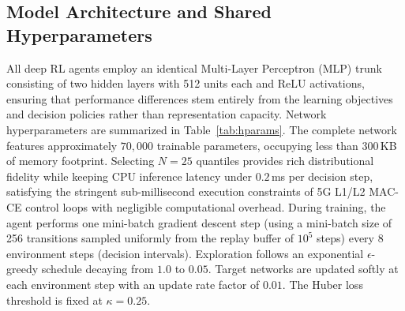 \documentclass{ieeetmlcn}
\begin{document}
\subsection{Model Architecture and Shared Hyperparameters}
All deep RL agents employ an identical Multi-Layer Perceptron (MLP) trunk consisting of two hidden layers with 512 units each and ReLU activations, ensuring that performance differences stem entirely from the learning objectives and decision policies rather than representation capacity. Network hyperparameters are summarized in Table~\ref{tab:hparams}. The complete network features approximately $70{,}000$ trainable parameters, occupying less than $300$\,KB of memory footprint. Selecting $N=25$ quantiles provides rich distributional fidelity while keeping CPU inference latency under $0.2$\,ms per decision step, satisfying the stringent sub-millisecond execution constraints of 5G L1/L2 MAC-CE control loops with negligible computational overhead. During training, the agent performs one mini-batch gradient descent step (using a mini-batch size of 256 transitions sampled uniformly from the replay buffer of $10^5$ steps) every 8 environment steps (decision intervals). Exploration follows an exponential $\epsilon$-greedy schedule decaying from $1.0$ to $0.05$. Target networks are updated softly at each environment step with an update rate factor of $0.01$. The Huber loss threshold is fixed at $\kappa = 0.25$.
\end{document}

